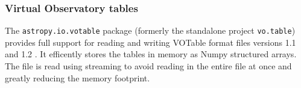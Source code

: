 \documentclass[traditabstract]{aa}
\begin{document}

%
%
%
%
%
%
%

\subsubsection{Virtual Observatory tables}

The \texttt{astropy.io.votable} package (formerly the standalone project
\texttt{vo.table}) provides full support for reading and writing
VOTable format files versions 1.1 and 1.2
\citep{ochsenbein2004votable,ochsenbein2009votable}.  It efficently
stores the tables in memory as Numpy structured arrays.  The file is
read using streaming to avoid reading in the entire file at once and
greatly reducing the memory footprint.
\end{document}
